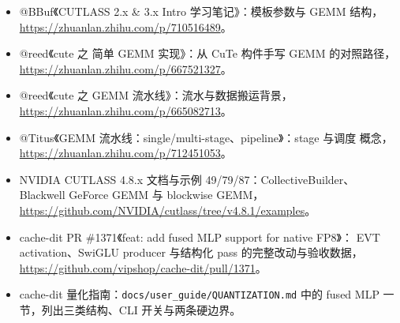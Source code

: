\begin{itemize}[itemsep=1pt,topsep=2pt]
  \item @BBuf《CUTLASS 2.x \& 3.x Intro 学习笔记》：模板参数与 GEMM 结构，
        \url{https://zhuanlan.zhihu.com/p/710516489}。
  \item @reed《cute 之 简单 GEMM 实现》：从 CuTe 构件手写 GEMM 的对照路径，
        \url{https://zhuanlan.zhihu.com/p/667521327}。
  \item @reed《cute 之 GEMM 流水线》：流水与数据搬运背景，
        \url{https://zhuanlan.zhihu.com/p/665082713}。
  \item @Titus《GEMM 流水线：single/multi-stage、pipeline》：stage 与调度
        概念，\url{https://zhuanlan.zhihu.com/p/712451053}。
  \item NVIDIA CUTLASS 4.8.x 文档与示例 49/79/87：CollectiveBuilder、
        Blackwell GeForce GEMM 与 blockwise GEMM，
        \url{https://github.com/NVIDIA/cutlass/tree/v4.8.1/examples}。
  \item cache-dit PR \#1371《feat: add fused MLP support for native FP8》：
        EVT activation、SwiGLU producer 与结构化 pass 的完整改动与验收数据，
        \url{https://github.com/vipshop/cache-dit/pull/1371}。
  \item cache-dit 量化指南：\texttt{docs/user\_guide/QUANTIZATION.md} 中的
        fused MLP 一节，列出三类结构、CLI 开关与两条硬边界。
\end{itemize}
